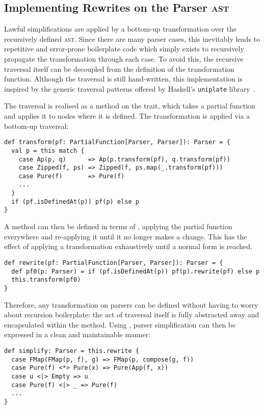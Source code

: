 \documentclass[../../../main.tex]{subfiles}
\begin{document}
\subsection{Implementing Rewrites on the Parser \textsc{ast}}\label{sec:parser-rewrites}
Lawful simplifications are applied by a bottom-up transformation over the recursively defined  \textsc{ast}.
Since there are many parser cases, this inevitably leads to repetitive and error-prone boilerplate code which simply exists to recursively propagate the transformation through each case.
To avoid this, the recursive traversal itself can be decoupled from the definition of the transformation function.
Although the traversal is still hand-written, this implementation is inspired by the generic traversal patterns offered by Haskell's \texttt{uniplate} library~\cite{mitchell_uniform_2007}.

The traversal is realised as a  method on the  trait, which takes a partial function and applies it to nodes where it is defined.
The transformation is applied via a bottom-up traversal:
\begin{verbatim}
def transform(pf: PartialFunction[Parser, Parser]): Parser = {
  val p = this match {
    case Ap(p, q)      => Ap(p.transform(pf), q.transform(pf))
    case Zipped(f, ps) => Zipped(f, ps.map(_.transform(pf)))
    case Pure(f)       => Pure(f)
    ...
  }
  if (pf.isDefinedAt(p)) pf(p) else p
}
\end{verbatim}
%
A  method can then be defined in terms of , applying the partial function everywhere and re-applying it until it no longer makes a change.
This has the effect of applying a transformation exhaustively until a normal form is reached.
\begin{verbatim}
def rewrite(pf: PartialFunction[Parser, Parser]): Parser = {
  def pf0(p: Parser) = if (pf.isDefinedAt(p)) pf(p).rewrite(pf) else p
  this.transform(pf0)
}
\end{verbatim}
%
Therefore, any transformation on parsers can be defined without having to worry about recursion boilerplate: the act of traversal itself is fully abstracted away and encapsulated within the  method.
Using , parser simplification can then be expressed in a clean and maintainable manner:
\begin{verbatim}
def simplify: Parser = this.rewrite {
  case FMap(FMap(p, f), g) => FMap(p, compose(g, f))
  case Pure(f) <*> Pure(x) => Pure(App(f, x))
  case u <|> Empty => u
  case Pure(f) <|> _ => Pure(f)
  ...
}
\end{verbatim}
%
\end{document}
